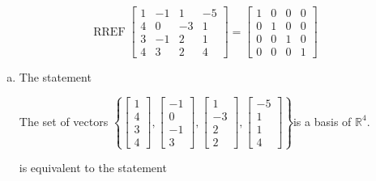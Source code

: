 \begin{exerciseAnswer} 


\[\operatorname{RREF} \left[\begin{array}{cccc}
1 & -1 & 1 & -5 \\
4 & 0 & -3 & 1 \\
3 & -1 & 2 & 1 \\
4 & 3 & 2 & 4
\end{array}\right] = \left[\begin{array}{cccc}
1 & 0 & 0 & 0 \\
0 & 1 & 0 & 0 \\
0 & 0 & 1 & 0 \\
0 & 0 & 0 & 1
\end{array}\right] \]


\begin{enumerate}[(a)]
\item The statement 
\begin{center}\begin{minipage}{0.8\textwidth}
 The set of vectors \( \left\{ \left[\begin{array}{c}
1 \\
4 \\
3 \\
4
\end{array}\right] , \left[\begin{array}{c}
-1 \\
0 \\
-1 \\
3
\end{array}\right] , \left[\begin{array}{c}
1 \\
-3 \\
2 \\
2
\end{array}\right] , \left[\begin{array}{c}
-5 \\
1 \\
1 \\
4
\end{array}\right] \right\} \)is a basis of \(\mathbb{R}^4\). 
\end{minipage}\end{center}
     is equivalent to the statement 
\begin{center}\begin{minipage}{0.8\textwidth}
 The set of vectors \( \left\{ \left[\begin{array}{c}
1 \\
4 \\

\end{array}
\end{minipage}
\end{center}
\end{enumerate}
\end{exerciseAnswer}
